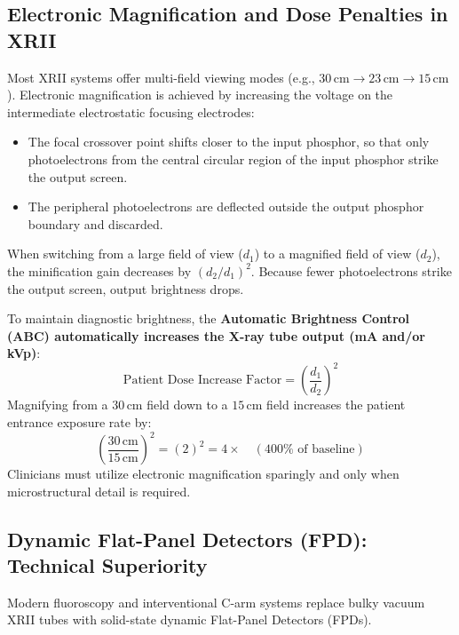 \documentclass[11pt,a4paper]{article}
\begin{document}
\subsection{Electronic Magnification and Dose Penalties in XRII}

Most XRII systems offer multi-field viewing modes (e.g., $30\,\text{cm} \rightarrow 23\,\text{cm} \rightarrow 15\,\text{cm}$). Electronic magnification is achieved by increasing the voltage on the intermediate electrostatic focusing electrodes:
\begin{itemize}[leftmargin=*]
    \item The focal crossover point shifts closer to the input phosphor, so that only photoelectrons from the central circular region of the input phosphor strike the output screen.
    \item The peripheral photoelectrons are deflected outside the output phosphor boundary and discarded.
\end{itemize}

\begin{clinicalpearl}
When switching from a large field of view ($d_1$) to a magnified field of view ($d_2$), the minification gain decreases by $(d_2 / d_1)^2$. Because fewer photoelectrons strike the output screen, output brightness drops. 

To maintain diagnostic brightness, the \textbf{Automatic Brightness Control (ABC) automatically increases the X-ray tube output (mA and/or kVp)}:
\begin{equation}
    \text{Patient Dose Increase Factor} = \left( \frac{d_1}{d_2} \right)^2
\end{equation}
Magnifying from a $30\,\text{cm}$ field down to a $15\,\text{cm}$ field increases the patient entrance exposure rate by:
\begin{equation}
    \left( \frac{30\,\text{cm}}{15\,\text{cm}} \right)^2 = (2)^2 = 4\times \quad (400\%\text{ of baseline})
\end{equation}
Clinicians must utilize electronic magnification sparingly and only when microstructural detail is required.
\end{clinicalpearl}

\subsection{Dynamic Flat-Panel Detectors (FPD): Technical Superiority}

Modern fluoroscopy and interventional C-arm systems replace bulky vacuum XRII tubes with solid-state dynamic Flat-Panel Detectors (FPDs).
\end{document}

